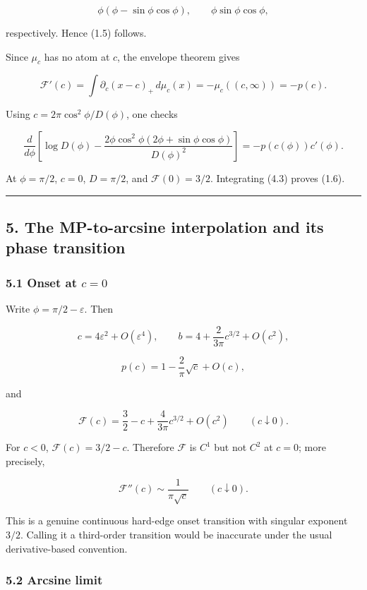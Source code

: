 \documentclass[11pt]{article}
\theoremstyle{keio}
\theoremstyle{definition}
\theoremstyle{remark}
\begin{document}
\[
\phi(\phi-\sin\phi\cos\phi),
\qquad
\phi\sin\phi\cos\phi,
\]

respectively. Hence (1.5) follows.

Since \(\mu_c\) has no atom at \(c\), the envelope theorem gives

\[
\mathcal F'(c)
=\int\partial_c(x-c)_+\,d\mu_c(x)
=-\mu_c((c,\infty))=-p(c). \tag{DS-4.2}
\]

Using \(c=2\pi\cos^2\phi/D(\phi)\), one checks

\[
\frac{d}{d\phi}\left[
\log D(\phi)
-\frac{2\phi\cos^2\phi
(2\phi+\sin\phi\cos\phi)}{D(\phi)^2}
\right]
=-p(c(\phi))c'(\phi). \tag{DS-4.3}
\]

At \(\phi=\pi/2\), \(c=0\), \(D=\pi/2\), and
\(\mathcal F(0)=3/2\). Integrating (4.3) proves (1.6).

\begin{center}\rule{0.5\linewidth}{0.5pt}\end{center}

\subsection{5. The MP-to-arcsine interpolation and its phase transition}

\subsubsection{\texorpdfstring{5.1 Onset at \(c=0\)}{5.1 Onset at c=0}}

Write \(\phi=\pi/2-\varepsilon\). Then

\[
c=4\varepsilon^2+O(\varepsilon^4),
\qquad
b=4+\frac{2}{3\pi}c^{3/2}+O(c^2), \tag{DS-5.1}
\]

\[
p(c)=1-\frac{2}{\pi}\sqrt c+O(c), \tag{DS-5.2}
\]

and

\[
\boxed{
\mathcal F(c)=\frac32-c+\frac{4}{3\pi}c^{3/2}+O(c^2)
\qquad(c\downarrow0).} \tag{DS-5.3}
\]

For \(c<0\), \(\mathcal F(c)=3/2-c\). Therefore \(\mathcal F\) is
\(C^1\) but not \(C^2\) at \(c=0\); more precisely,

\[
\mathcal F''(c)\sim\frac1{\pi\sqrt c}\qquad(c\downarrow0).
\]

This is a genuine continuous hard-edge onset transition with singular
exponent \(3/2\). Calling it a third-order transition would be inaccurate
under the usual derivative-based convention.

\subsubsection{5.2 Arcsine limit}
\end{document}
